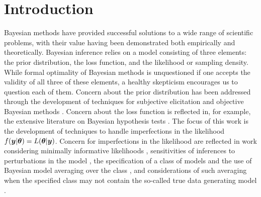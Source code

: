 \documentclass[ba]{imsart}
\def\bth{\mbox{\boldmath $\theta$}}
\newcommand{\by}{\mbox{\boldmath $y$}}
\begin{document}
\begin{frontmatter}

\begin{keyword}
\end{keyword}

\end{frontmatter}

\section{Introduction}
Bayesian methods have provided successful solutions to a wide range of scientific problems, with their value
having been demonstrated both empirically and theoretically.  Bayesian inference relies on a model consisting of three elements:  the prior distribution, the loss function, and the likelihood or sampling density.  While formal optimality of Bayesian methods is unquestioned if one accepts the validity of all three of these elements, a healthy skepticism encourages us to question each of them.  Concern about the prior distribution has been addressed through the development of techniques for subjective elicitation \citep{garthwaite2005, ohagan2006} and objective Bayesian methods \citep{berger2006}.  Concern about the loss function is reflected in, for example, the extensive literature on Bayesian hypothesis tests \citep{kass1995}.  The focus of this work is the development of techniques to handle imperfections in the likelihood $f(\by|\bth) = L(\bth|\by)$. Concern for imperfections in the likelihood are reflected in work considering minimally informative likelihoods \citep{yuan1999minimally}, sensitivities of inferences to perturbations in the model \citep{zhu2011}, the specification of a class of models and the use of Bayesian model averaging over the class \citep{clyde2004}, and considerations of such averaging when the specified class may not contain the so-called true data generating model \citep{bernardo2000, clyde2013, clarke2013Complete}.  
\end{document}
